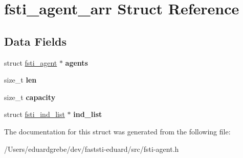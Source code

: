 \hypertarget{structfsti__agent__arr}{}\section{fsti\+\_\+agent\+\_\+arr Struct Reference}
\label{structfsti__agent__arr}
\subsection*{Data Fields}
\begin{DoxyCompactItemize}
\item 
\mbox{\label{structfsti__agent__arr_a7e4787915398bdddff99fa7526ffd1df}} 
struct \mbox{\hyperlink{structfsti__agent}{fsti\+\_\+agent}} $\ast$ {\bfseries agents}
\item 
\mbox{\label{structfsti__agent__arr_a7a3aad9a85b02c5bdeac139912f2dd94}} 
size\+\_\+t {\bfseries len}
\item 
\mbox{\label{structfsti__agent__arr_a6b584cff02d8f68448a2c1a948880279}} 
size\+\_\+t {\bfseries capacity}
\item 
\mbox{\label{structfsti__agent__arr_ae71448f56b3474ebeb7efecab3651968}} 
struct \mbox{\hyperlink{structfsti__ind__list}{fsti\+\_\+ind\+\_\+list}} $\ast$ {\bfseries ind\+\_\+list}
\end{DoxyCompactItemize}


The documentation for this struct was generated from the following file\+:\begin{DoxyCompactItemize}
\item 
/\+Users/eduardgrebe/dev/faststi-\/eduard/src/fsti-\/agent.\+h\end{DoxyCompactItemize}
